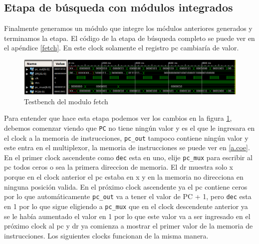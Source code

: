 \subsection{Etapa de búsqueda con módulos integrados}
Finalmente generamos un m\'odulo que integre los módulos anteriores generados y terminamos la etapa. El código de la etapa de búsqueda completo se puede ver en el apéndice \ref{fetch}. En este clock solamente el registro \ac{pc} cambiaría de valor. 

\begin{figure}[H]
\centering
\includegraphics[scale=0.45]{Capitulo01/fetch_test}
\caption{Testbench del modulo fetch}
\label{fig:fetcht}
\end{figure}

Para entender que hace esta etapa podemos ver los cambios en la figura \ref{fig:fetcht}, debemos comenzar viendo que \texttt{PC} no tiene ningún valor y es el que le ingresara en el clock a la memoria de instrucciones, \texttt{pc\_out} tampoco contiene ningún valor y este entra en el multiplexor, la memoria de instrucciones se puede ver en \ref{a.coe}.  
En el primer clock ascendente como \texttt{dec} esta en uno, elije \texttt{pc\_mux} para escribir al \ac{pc} todos ceros o sea la primera direccion de memoria. El \ac{dr}  muestra  solo x porque en el clock anterior el \ac{pc} estaba en x y en la memoria no direcciona en ninguna posición valida. En el próximo clock ascendente ya el \ac{pc} contiene ceros por lo que automáticamente \texttt{pc\_out} va a tener el valor de \ac{PC} + 1, pero \texttt{dec} esta en 1 por lo que sigue eligiendo a \texttt{pc\_mux} que en el clock descendente anterior ya se le había aumentado el valor en 1 por lo que este valor va a ser ingresado en el próximo clock al \ac{pc} y \ac{dr} ya comienza a mostrar el primer valor de la memoria de instrucciones. Los siguientes clocks funcionan de la misma manera.

